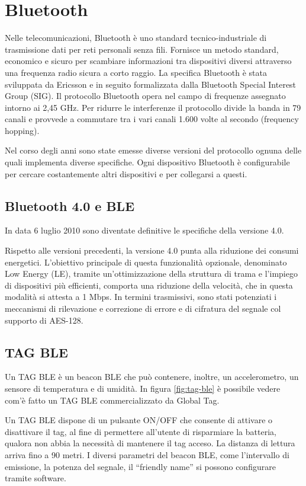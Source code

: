 \section{Bluetooth}
Nelle telecomunicazioni, Bluetooth \cite{wiki:bluetooth} è uno standard tecnico-industriale di trasmissione dati per reti personali senza fili. Fornisce un metodo standard, economico e sicuro per scambiare informazioni tra dispositivi diversi attraverso una frequenza radio sicura a corto raggio.
La specifica Bluetooth è stata sviluppata da Ericsson e in seguito formalizzata dalla Bluetooth Special Interest Group (SIG). Il protocollo Bluetooth opera nel campo di frequenze assegnato intorno ai 2,45 GHz. Per ridurre le interferenze il protocollo divide la banda in 79 canali e provvede a commutare tra i vari canali 1.600 volte al secondo (frequency hopping).

Nel corso degli anni sono state emesse diverse versioni del protocollo ognuna delle quali implementa diverse specifiche. Ogni dispositivo Bluetooth è configurabile per cercare costantemente altri dispositivi e per collegarsi a questi.

\subsection{Bluetooth 4.0 e BLE}
In data 6 luglio 2010 sono diventate definitive le specifiche della versione 4.0.

Rispetto alle versioni precedenti, la versione 4.0 punta alla riduzione dei consumi energetici. L'obiettivo principale di questa funzionalità opzionale, denominato Low Energy (LE), tramite un'ottimizzazione della struttura di trama e l'impiego di dispositivi più efficienti, comporta una riduzione della velocità, che in questa modalità si attesta a 1 Mbps. In termini trasmissivi, sono stati potenziati i meccanismi di rilevazione e correzione di errore e di cifratura del segnale col supporto di AES-128.

\subsection{TAG BLE}
Un TAG BLE \cite{globaltag:tagble} è un beacon BLE che può contenere, inoltre, un accelerometro, un sensore di temperatura e di umidità. In figura \ref{fig:tag-ble} è possibile vedere com'è fatto un TAG BLE commercializzato da Global Tag.

Un TAG BLE dispone di un pulsante ON/OFF che consente di attivare o disattivare il tag, al fine di permettere all’utente di risparmiare la batteria, qualora non abbia la necessità di mantenere il tag acceso. La distanza di lettura arriva fino a 90 metri. I diversi parametri del beacon BLE, come l’intervallo di emissione, la potenza del segnale, il ``friendly name'' si possono configurare tramite software.

